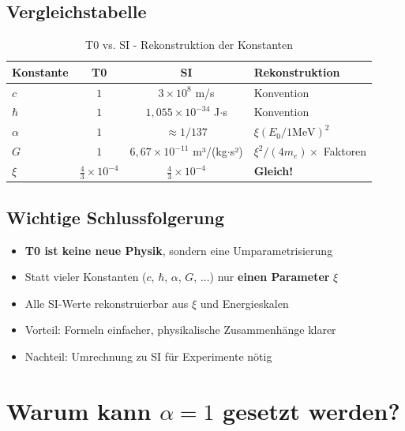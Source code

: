 	\subsection{Vergleichstabelle}
	
	\begin{table}[h]
		\centering
		\begin{tabular}{|l|c|c|l|}
			\hline
			\textbf{Konstante} & \textbf{T0} & \textbf{SI} & \textbf{Rekonstruktion} \\
			\hline
			$c$ & $1$ & $3 \times 10^8$ m/s & Konvention \\
			$\hbar$ & $1$ & $1{,}055 \times 10^{-34}$ J$\cdot$s & Konvention \\
			$\alpha$ & $1$ & $\approx 1/137$ & $\xi(E_0/1\text{MeV})^2$ \\
			$G$ & $1$ & $6{,}67 \times 10^{-11}$ m³/(kg$\cdot$s²) & $\xi^2/(4m_e) \times$ Faktoren \\
			$\xi$ & $\frac{4}{3} \times 10^{-4}$ & $\frac{4}{3} \times 10^{-4}$ & \textbf{Gleich!} \\
			\hline
		\end{tabular}
		\caption{T0 vs. SI - Rekonstruktion der Konstanten}
	\end{table}
	
	\subsection{Wichtige Schlussfolgerung}
	
	\begin{itemize}
		\item \textbf{T0 ist keine neue Physik}, sondern eine Umparametrisierung
		
		\item Statt vieler Konstanten ($c$, $\hbar$, $\alpha$, $G$, ...) nur \textbf{einen Parameter} $\xi$
		
		\item Alle SI-Werte rekonstruierbar aus $\xi$ und Energieskalen
		
		\item Vorteil: Formeln einfacher, physikalische Zusammenhänge klarer
		
		\item Nachteil: Umrechnung zu SI für Experimente nötig
	\end{itemize}
	
	\section{Warum kann $\alpha = 1$ gesetzt werden?}
	
